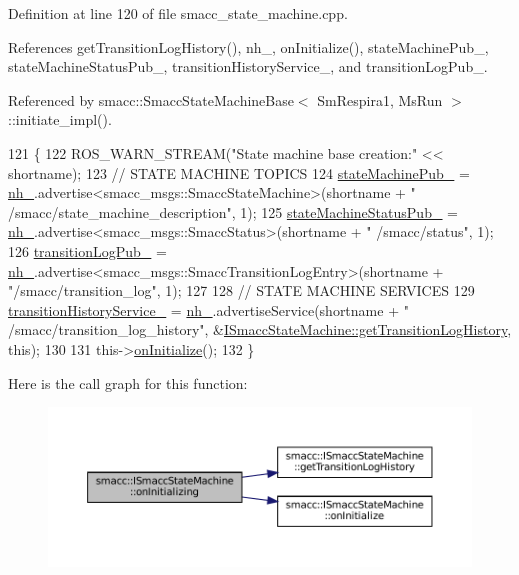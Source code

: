 Definition at line 120 of file smacc\+\_\+state\+\_\+machine.\+cpp.



References get\+Transition\+Log\+History(), nh\+\_\+, on\+Initialize(), state\+Machine\+Pub\+\_\+, state\+Machine\+Status\+Pub\+\_\+, transition\+History\+Service\+\_\+, and transition\+Log\+Pub\+\_\+.



Referenced by smacc\+::\+Smacc\+State\+Machine\+Base$<$ Sm\+Respira1, Ms\+Run $>$\+::initiate\+\_\+impl().


\begin{DoxyCode}
121 \{
122     ROS\_WARN\_STREAM(\textcolor{stringliteral}{"State machine base creation:"} << shortname);
123     \textcolor{comment}{// STATE MACHINE TOPICS}
124     \hyperlink{classsmacc_1_1ISmaccStateMachine_af4aa9fed70bd4c57b19e3370fbd25de7}{stateMachinePub\_} = \hyperlink{classsmacc_1_1ISmaccStateMachine_ad8877bcca9dbb345fe72cca839c93dd3}{nh\_}.advertise<smacc\_msgs::SmaccStateMachine>(shortname + \textcolor{stringliteral}{"
      /smacc/state\_machine\_description"}, 1);
125     \hyperlink{classsmacc_1_1ISmaccStateMachine_a55a7c7b26ad4dfea441c62c6326a5414}{stateMachineStatusPub\_} = \hyperlink{classsmacc_1_1ISmaccStateMachine_ad8877bcca9dbb345fe72cca839c93dd3}{nh\_}.advertise<smacc\_msgs::SmaccStatus>(shortname + \textcolor{stringliteral}{"
      /smacc/status"}, 1);
126     \hyperlink{classsmacc_1_1ISmaccStateMachine_acc42eb050325c1edc77d81675fb1286a}{transitionLogPub\_} = \hyperlink{classsmacc_1_1ISmaccStateMachine_ad8877bcca9dbb345fe72cca839c93dd3}{nh\_}.advertise<smacc\_msgs::SmaccTransitionLogEntry>(shortname + \textcolor{stringliteral}{
      "/smacc/transition\_log"}, 1);
127 
128     \textcolor{comment}{// STATE MACHINE SERVICES}
129     \hyperlink{classsmacc_1_1ISmaccStateMachine_a73e2a7ca89c3d807eafe5cfb1e86ea05}{transitionHistoryService\_} = \hyperlink{classsmacc_1_1ISmaccStateMachine_ad8877bcca9dbb345fe72cca839c93dd3}{nh\_}.advertiseService(shortname + \textcolor{stringliteral}{"
      /smacc/transition\_log\_history"}, &\hyperlink{classsmacc_1_1ISmaccStateMachine_ae7c08fc2addf8ee4785f721050e6a763}{ISmaccStateMachine::getTransitionLogHistory}, \textcolor{keyword}{
      this});
130 
131     this->\hyperlink{classsmacc_1_1ISmaccStateMachine_ac2982c6c8283663e5e1e8a7c82f511ec}{onInitialize}();
132 \}
\end{DoxyCode}
Here is the call graph for this function\+:
\nopagebreak
\begin{figure}[H]
\begin{center}
\leavevmode
\includegraphics[width=350pt]{classsmacc_1_1ISmaccStateMachine_ae8c9c79ca6cd77c975f5d9cda33a6d5e_cgraph}
\end{center}
\end{figure}
